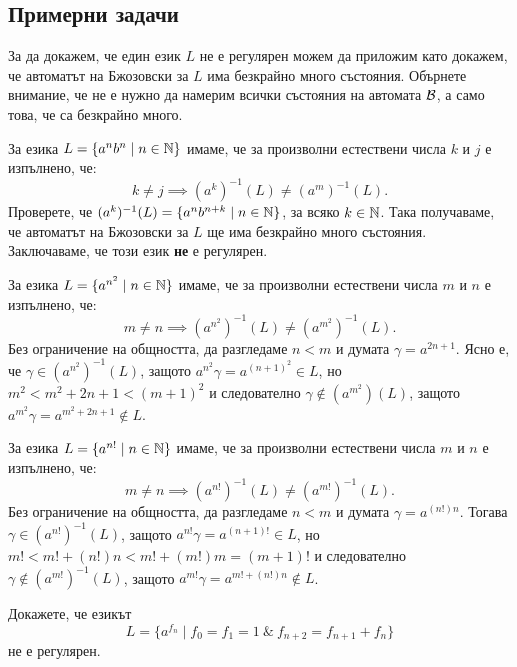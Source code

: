 \subsection{Примерни задачи}

За да докажем, че един език $L$ не е регулярен можем да приложим 
като докажем, че автоматът на Бжозовски за $L$ има безкрайно много състояния.
Обърнете внимание, че не е нужно да намерим всички състояния на автомата $\mathcal{B}$, а само това, че са безкрайно много.

\begin{example}
  За езика $L = \{a^nb^n\mid n \in \mathbb{N}\}$ имаме, че за произволни естествени числа $k$ и $j$ е изпълнено, че:
  \[k \neq j \implies (a^k)^{-1}(L) \neq (a^m)^{-1}(L).\]
  Проверете, че $(a^k)^{-1}(L) = \{a^{n}b^{n+k} \mid n\in\mathbb{N}\}$, за всяко $k \in \mathbb{N}$.
  Така получаваме, че автоматът на Бжозовски за $L$ ще има безкрайно много състояния.
  Заключаваме, че този език {\bf не} е регулярен.
\end{example}

\begin{example}
  За езика $L = \{a^{n^2} \mid n \in \mathbb{N}\}$ имаме, че за произволни естествени числа $m$ и $n$ е изпълнено, че:
  \[m \neq n \implies (a^{n^2})^{-1}(L) \neq (a^{m^2})^{-1}(L).\]
  Без ограничение на общността, да разгледаме $n < m$ и думата $\gamma = a^{2n+1}$.
  Ясно е, че $\gamma \in (a^{n^2})^{-1}(L)$, защото $a^{n^2}\gamma = a^{(n+1)^2} \in L$, но 
  $m^2 < m^2 + 2n + 1 < (m+1)^2$ и следователно $\gamma \not\in (a^{m^2})(L)$, защото $a^{m^2}\gamma = a^{m^2+2n+1}\not\in L$.
\end{example}

\begin{example}
  За езика $L = \{a^{n!} \mid n \in \mathbb{N}\}$ имаме, че за произволни естествени числа $m$ и $n$ е изпълнено, че:
  \[m \neq n \implies (a^{n!})^{-1}(L) \neq (a^{m!})^{-1}(L).\]
  Без ограничение на общността, да разгледаме $n < m$ и думата $\gamma = a^{(n!)n}$.
  Тогава $\gamma \in (a^{n!})^{-1}(L)$, защото $a^{n!}\gamma = a^{(n+1)!} \in L$, но 
  $m! < m! + (n!)n < m! + (m!)m = (m+1)!$ и следователно $\gamma \not\in (a^{m!})^{-1}(L)$,
  защото $a^{m!}\gamma = a^{m!+(n!)n}\not\in L$.
\end{example}

\begin{problem}
  Докажете, че езикът 
  \[L = \{a^{f_n} \mid f_0 = f_1 = 1\ \&\ f_{n+2} = f_{n+1} + f_{n}\}\]
  не е регулярен.
\end{problem}

